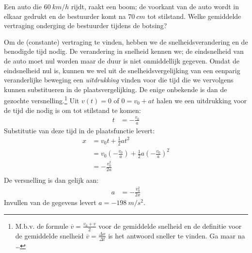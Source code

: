 \documentclass{ximera}
\begin{document}
\begin{exercise}

    Een auto die $\SI{60}{km/h}$ rijdt, raakt een boom; de voorkant van de auto wordt in elkaar gedrukt en de bestuurder komt na $\SI{70}{cm}$ tot stilstand. Welke gemiddelde vertraging onderging de bestuurder tijdens de botsing?%
    \begin{oplossing} 
    Om de (constante) vertraging te vinden, hebben we de snelheidsverandering en de benodigde tijd nodig. De verandering in snelheid kennen we; de eindsnelheid van de auto moet nul worden maar de duur is niet onmiddellijk gegeven. Omdat de eindsnelheid nul is, kunnen we wel uit de snelheidsvergelijking van een eenparig veranderlijke beweging een \emph{uitdrukking} vinden voor die tijd die we vervolgens kunnen substitueren in de plaatsvergelijking. De enige onbekende is dan de gezochte versnelling.\footnote{M.b.v. de formule $\overline{v}=\frac{v_0+v}{2}$ voor de gemiddelde snelheid en de definitie voor de gemiddelde snelheid $\overline{v}=\frac{\Delta x}{\Delta t}$ is het antwoord sneller te vinden. Ga maar na \ldots}
    Uit $v(t)=0$ of $0=v_0+at$ halen we een uitdrukking voor de tijd die nodig is om tot stilstand te komen:
    \begin{align*}
    t&=-\frac{v_0}{a}
    \end{align*}
    Substitutie van deze tijd in de plaatsfunctie levert:
    \begin{align*}
    x&=v_0t+\frac{1}{2}at^2\\
    &=v_0\left(-\frac{v_0}{a}\right)+\frac{1}{2}a\left(-\frac{v_0}{a}\right)^2\\
    &=-\frac{v_0^2}{2a}\\
    \end{align*}
    De versnelling is dan gelijk aan:
    \begin{align*}
    a&=-\frac{v_0^2}{2x}
    \end{align*}
    Invullen van de gegevens levert $a=\SI{-198}{m/s^2}$.%
    \end{oplossing}
    \end{exercise}
    
\end{document}
